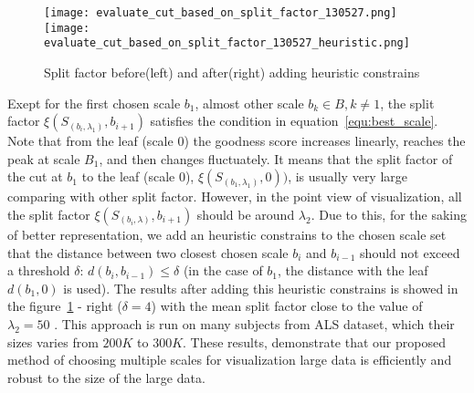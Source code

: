 \begin{figure}
  \centering
  \texttt{[image: evaluate\_cut\_based\_on\_split\_factor\_130527.png]}
  \texttt{[image: evaluate\_cut\_based\_on\_split\_factor\_130527\_heuristic.png]}
  \caption{Split factor before(left) and after(right) adding heuristic constrains}
  \label{fig:goodness_score}
\end{figure}

Exept for the first chosen scale $b_1$, almost other scale $b_k \in \mathsf{\textit{B}}, k \neq 1$, the split factor $\xi(S_{(b_i,\lambda_1)},b_{i+1})$ satisfies the condition in equation~\ref{equ:best_scale}. Note that from the leaf (scale $0$) the goodness score increases linearly, reaches the peak at scale $B_1$, and then changes fluctuately. It means that the split factor of the cut at $b_1$ to the leaf (scale $0$), $\xi(S_{(b_1,\lambda_1)},0))$, is usually very large comparing with other split factor. However, in the point view of visualization, all the split factor $\xi(S_{(b_i,\lambda)},b_{i+1})$ should be around $\lambda_2$. Due to this, for the saking of better representation, we add an heuristic constrains to the chosen scale set that the distance between two closest chosen scale $b_i$ and $b_{i-1}$ should not exceed a threshold $\delta$: $d(b_i,b_{i-1}) \leq \delta$ (in the case of $b_1$, the distance with the leaf $d(b_1,0)$ is used). The results after adding this heuristic constrains is showed in the figure~\ref{fig:goodness_score} - right ($\delta = 4$) with the mean split factor close to the value of $\lambda_2 = 50$ . This approach is run on many subjects from ALS dataset, which their sizes varies from $200K$ to $300K$. These results, demonstrate that our proposed method of choosing multiple scales for visualization large data is efficiently and robust to the size of the large data. 


